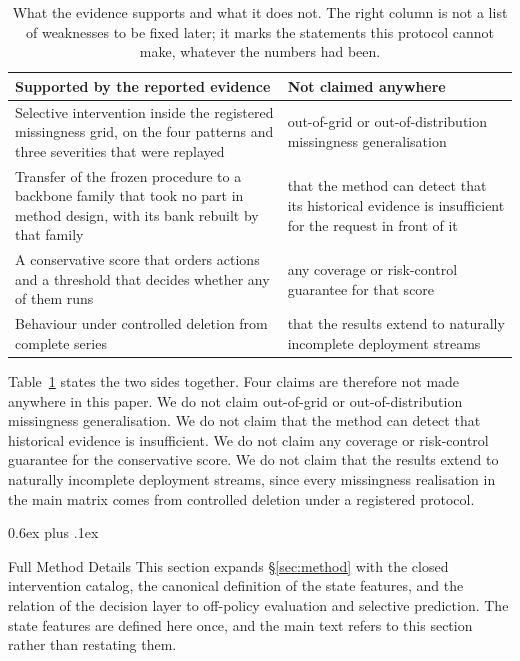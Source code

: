 \documentclass{article}
\makeatletter
\def\subsection{\@startsection{subsection}{2}{\z@}{-1.4ex plus -0.4ex minus -.2ex}%
  {0.6ex plus .1ex}{\normalsize\sc\raggedright}}
\makeatother
\begin{document}
\begin{table}[h]
  \caption{What the evidence supports and what it does not. The right column is not a list of
  weaknesses to be fixed later; it marks the statements this protocol cannot make, whatever the
  numbers had been.}
  \label{tab:app-claims}
  \centering
  \small
  \setlength{\tabcolsep}{4pt}
\begin{tabular}{@{}p{} p{}@{}}
    \toprule
    Supported by the reported evidence & Not claimed anywhere \\
    \midrule
    Selective intervention inside the registered missingness grid, on the four patterns and three severities that were replayed & out-of-grid or out-of-distribution missingness generalisation \\
    Transfer of the frozen procedure to a backbone family that took no part in method design, with its bank rebuilt by that family & that the method can detect that its historical evidence is insufficient for the request in front of it \\
    A conservative score that orders actions and a threshold that decides whether any of them runs & any coverage or risk-control guarantee for that score \\
    Behaviour under controlled deletion from complete series & that the results extend to naturally incomplete deployment streams \\
    \bottomrule
  \end{tabular}
\end{table}

Table~\ref{tab:app-claims} states the two sides together. Four claims are therefore not made
anywhere in this paper. We do not claim out-of-grid or
out-of-distribution missingness generalisation. We do not claim that the method can detect
that historical evidence is insufficient. We do not claim any coverage or risk-control
guarantee for the conservative score. We do not claim that the results extend to naturally
incomplete deployment streams, since every missingness realisation in the main matrix comes
from controlled deletion under a registered protocol.


\subsection{Full Method Details}
\label{app:method-details}
This section expands \S\ref{sec:method} with the closed intervention catalog, the canonical
definition of the state features, and the relation of the decision layer to off-policy
evaluation and selective prediction. The state features are defined here once, and the main
text refers to this section rather than restating them.
\end{document}
